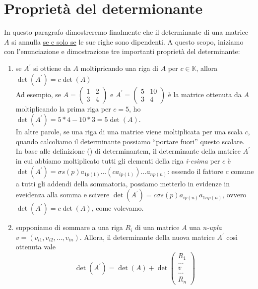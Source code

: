 \documentclass{book}
\begin{document}
\section{Proprietà del determionante}
In questo paragrafo dimostreremo finalmente che il determinante di una matrice $A$ si annulla \underline{se e solo se} le sue righe sono dipendenti. A questo scopo, iniziamo con l'enunciazione e dimostrazione tre importanti proprietà del determinante:
\begin{enumerate}
\item se $A^\prime$ si ottiene da $A$ moltipricando una riga di $A$ per $c\in \mathds{K}$, allora $\det(A^\prime)=c\det(A)$\\
  Ad esempio, se $A=\begin{pmatrix} 1 & 2 \\ 3 & 4 \end{pmatrix}$ e $A^\prime =\begin{pmatrix} 5 & 10 \\ 3 &4 \end{pmatrix}$ è la matrice ottenuta da $A$ moltiplicando la prima riga per $c=5$, ho $\det(A^\prime)=5*4-10*3=5\det (A)$.\\
  In altre parole, se una riga di una matrice viene moltiplicata per una scala $c$, quando calcoliamo il determinante possiamo ``portare fuori'' questo scalare.\\
  In base alle definizione ({\it <++>}) di determinantem, il determinante della matrice $A^\prime$ in cui abbiamo moltiplicato tutti gli elementi della riga \textit{i-esima} per $c$ è $\det (A^\prime)=\sigma s(p)a_{1p(1)}\dots(ca_{ip(1)})\dots a_{np(n)}$: essendo il fattore $c$ comune a tutti gli addendi della sommatoria, possiamo metterlo in evidenze in eveidenza alla somma e scivere $\det(A^\prime) = c \sigma s(p)a_{ip(n)}a_{1np(n)}$, ovvero $\det(A^\prime)=c\det(A)$, come volevamo.
\item supponiamo di sommare a una riga $R_i$ di una matrice $A$ una \textit{n-upla} $v=(v_{i1},v_{i2},\dots,v_{in})$. Allora, il determinante della nuova matrice $A^\prime$ così ottenuta vale
  \begin{equation}
    \det(A^{\prime})=\det(A)+\det\begin{pmatrix} R_1 \\ \dots \\ v\\ \dots \\ R_n \end{pmatrix}
  \end{equation}

\end{enumerate}
\end{document}
